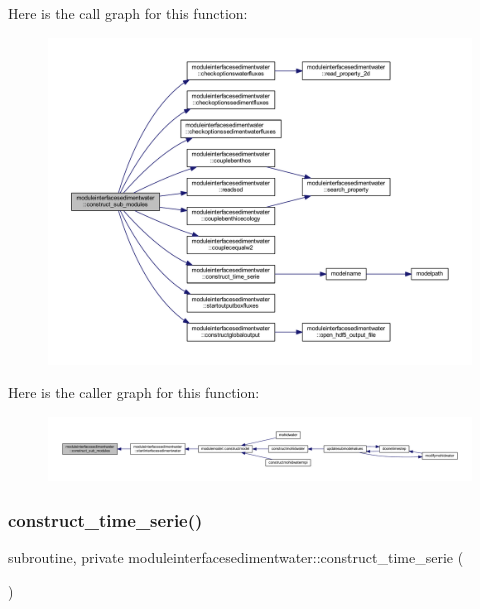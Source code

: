 Here is the call graph for this function\+:\nopagebreak
\begin{figure}[H]
\begin{center}
\leavevmode
\includegraphics[width=350pt]{namespacemoduleinterfacesedimentwater_a95c6fc880171b2c2d476ac8adcb366e0_cgraph}
\end{center}
\end{figure}
Here is the caller graph for this function\+:\nopagebreak
\begin{figure}[H]
\begin{center}
\leavevmode
\includegraphics[width=350pt]{namespacemoduleinterfacesedimentwater_a95c6fc880171b2c2d476ac8adcb366e0_icgraph}
\end{center}
\end{figure}
\mbox{\label{namespacemoduleinterfacesedimentwater_ad93a2c6131aefc16d45e6f81ca87678e}} 
\subsubsection{\texorpdfstring{construct\+\_\+time\+\_\+serie()}{construct\_time\_serie()}}
{\footnotesize\ttfamily subroutine, private moduleinterfacesedimentwater\+::construct\+\_\+time\+\_\+serie (\begin{DoxyParamCaption}{ }\end{DoxyParamCaption})\hspace{0.3cm}{\ttfamily [private]}}

